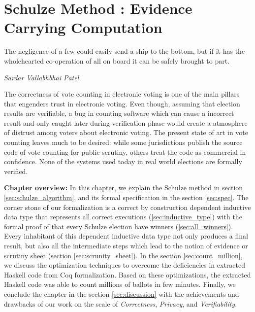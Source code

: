 \chapter{Schulze Method : Evidence Carrying Computation}
\label{cha:schulze_method}

\epigraph{The negligence of a few could easily send a ship to the bottom, but if it has the wholehearted 
co-operation of all on board it can be safely brought to part.} 
{\textit{Sardar Vallabhbhai Patel}} 

 The correctness of vote counting in electronic voting is one of 
 the main pillars that engenders trust in electronic voting. Even 
 though, assuming  that election results are verifiable, a bug in 
 counting software which can cause a incorrect result and only 
 caught later during verification phase would create a atmosphere of 
 distrust among voters about electronic voting. The present state of 
 art in vote counting leaves much to be desired: while some 
 jurisdictions publish the source code of vote counting for 
 public scrutiny, others treat the code as commercial in confidence. 
 None of the systems used today in real world elections are 
 formally verified.
 
 \textbf{Chapter overview:} In this chapter, we explain the Schulze method in section \ref{sec:schulze_algorithm}, 
 and its formal specification in the section \ref{sec:spec}. The  corner stone of our formalization is 
 a correct by construction dependent inductive data type 
 that represents all correct executions (\ref{sec:inductive_type}) with the formal proof of
 that every Schulze election have winners (\ref{sec:all_winners}).  Every inhabitant of 
 this dependent inductive data type not only produces a final result, but also all the 
 intermediate steps which lead to the notion of evidence or scrutiny sheet (section 
  \ref{sec:scrunity_sheet}).  In the section \ref{sec:count_million}, we discuss the optimization techniques
   to overcome the deficiencies in extracted Haskell code from Coq formalization. Based on 
   these optimizations, the extracted Haskell code was able to count millions of ballots in few 
   minutes. 
   Finally, we conclude the chapter in the section \ref{sec:discussion} with 
   the achievements and drawbacks of our work on the scale of \textit{Correctness},
   \textit{Privacy}, and \textit{Verifiability}.
 
